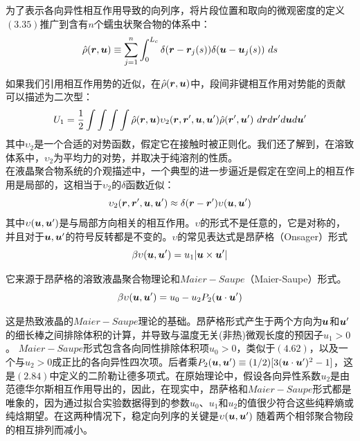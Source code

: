 为了表示各向异性相互作用导致的向列序，将片段位置和取向的微观密度的定义$(3.35)$推广到含有$n$个蠕虫状聚合物的体系中：\\
\begin{equation}
\hat{\rho}(\bm{r},\bm{u}) \equiv \sum_{j=1}^{n} \int _{0}^{L_{c}} \delta(\bm{r}-\bm{r}_{j}(s)) \delta (\bm{u}-\bm{u}_{j}(s))~ds
\end{equation}

如果我们引用相互作用势的近似，在$\hat{\rho}(\bm{r},\bm{u})$中，段间非键相互作用对势能的贡献可以描述为二次型：\\
\begin{equation}
U_1=\frac{1}{2} \int \int \int  \int  \hat{\rho}(\bm{r},\bm{u}) \upsilon_2(\bm{r},\bm{r}',\bm{u},\bm{u}') \hat{\rho}(\bm{r}',\bm{u}')~ d\bm{r} d\bm{r}' d\bm{u} d\bm{u}'
\end{equation}
其中$\upsilon_2$是一个合适的对势函数，假定它在接触时被正则化。我们还了解到，在溶致体系中，$\upsilon_2$为平均力的对势，并取决于纯溶剂的性质。\\

在液晶聚合物系统的介观描述中，一个典型的进一步逼近是假定在空间上的相互作用是局部的，这相当于$\upsilon_2$的$\delta$函数近似：\\
\begin{equation}
\upsilon_{2}(\bm{r},\bm{r}',\bm{u},\bm{u}') \approx \delta(\bm{r}-\bm{r}') \upsilon(\bm{u},\bm{u}')
\end{equation}
其中$\upsilon(\bm{u},\bm{u}')$是与局部方向相关的相互作用。$\upsilon$的形式不是任意的，它是对称的，并且对于$\bm{u},\bm{u}'$的符号反转都是不变的。$\upsilon$的常见表达式是昂萨格（Onsager）形式\\
\begin{equation}
\beta \upsilon(\bm{u},\bm{u}')= u_{1}|\bm{u}\times \bm{u}'|
\end{equation}

它来源于昂萨格的溶致液晶聚合物理论和$Maier-Saupe$（Maier-Saupe）形式。\\
\begin{equation}
\beta \upsilon(\bm{u},\bm{u}')=u_0 - u_{2} P_{2}(\bm{u} \cdot \bm{u}')
\end{equation}

这是热致液晶的$Maier-Saupe$理论的基础。昂萨格形式产生于两个方向为$\bm{u}$和$\bm{u}'$的细长棒之间排除体积的计算，并导致与温度无关(非热)微观长度的预因子$u_{1}>0$。 $Maier-Saupe$形式包含各向同性排除体积项$u_{0}>0$，类似于$(4.62)$，以及一个与$u_2>0$成正比的各向异性四次项。后者乘$P_{2}(\bm{u},\bm{u}')\equiv (1/2)[3(\bm{u}\cdot \bm{u}')^2-1]$，这是$(2.84)$中定义的二阶勒让德多项式。在原始理论中，假设各向异性系数$u_2$是由范德华尔斯相互作用导出的，因此，在现实中，昂萨格和$Maier-Saupe$形式都是唯象的，因为通过拟合实验数据得到的参数$u_0$、$u_1$和$u_2$的值很少符合这些纯粹熵或纯焓期望。在这两种情况下，稳定向列序的关键是$\upsilon (\bm{u},\bm{u}')$ 随着两个相邻聚合物段的相互排列而减小。\\


